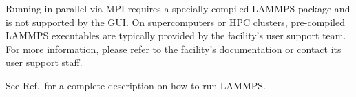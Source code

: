 \documentclass[9pt,tutorial]{livecoms}
\begin{document}
\begin{appendices}
\begin{note}
  Running in parallel via MPI requires a specially compiled LAMMPS
  package and is not supported by the GUI.  On supercomputers or HPC
  clusters, pre-compiled LAMMPS executables are typically provided
  by the facility's user support team.  For more information, please
  refer to the facility's documentation or contact its user support staff.
\end{note}

See Ref.\, for a complete description on how to
run LAMMPS.

\end{appendices}
\end{document}
